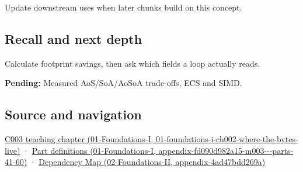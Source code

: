Update downstream uses when later chunks build on this concept.

\subsection{Recall and next depth}\label{appendix-5522ad176ca0-recall-and-next-depth}

Calculate footprint savings, then ask which fields a loop actually reads.

\textbf{Pending:} Measured AoS/SoA/AoSoA trade-offs, ECS and SIMD.

\subsection{Source and navigation}\label{appendix-5522ad176ca0-source-and-navigation}

\href{../01-Foundations-I/main.pdf\#nameddest=01-foundations-i-ch002-where-the-bytes-live}{C003 teaching chapter (01-Foundations-I, 01-foundations-i-ch002-where-the-bytes-live)} · \href{../01-Foundations-I/main.pdf\#nameddest=appendix-fd090d982a15-m003---parts-41-60}{Part definitions (01-Foundations-I, appendix-fd090d982a15-m003-\/-\/-parts-41-60)} · \href{../02-Foundations-II/main.pdf\#nameddest=appendix-4ad47bdd269a}{Dependency Map (02-Foundations-II, appendix-4ad47bdd269a)}
